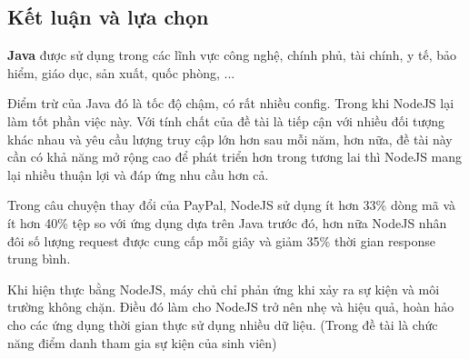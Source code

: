 \subsection{Kết luận và lựa chọn}
\textbf{Java} được sử dụng trong các lĩnh vực công nghệ, chính phủ, tài chính, y tế, bảo hiểm, giáo dục, sản xuất, quốc phòng, ...


Điểm trừ của Java đó là tốc độ chậm, có rất nhiều config. Trong khi NodeJS lại làm tốt phần việc này. Với tính chất của đề tài là tiếp cận với nhiều đối tượng khác nhau và yêu cầu lượng truy cập lớn hơn sau mỗi năm, hơn nữa, đề tài này cần có khả năng mở rộng cao để phát triển hơn trong tương lai thì NodeJS mang lại nhiều thuận lợi và đáp ứng nhu cầu hơn cả.

Trong câu chuyện thay đổi của PayPal, NodeJS sử dụng ít hơn 33\% dòng mã và ít hơn 40\% tệp so với ứng dụng dựa trên Java trước đó, hơn nữa NodeJS nhân đôi số lượng request được cung cấp mỗi giây và giảm 35\% thời gian response trung bình.


Khi hiện thực bằng NodeJS, máy chủ chỉ phản ứng khi xảy ra sự kiện và môi trường không chặn. Điều đó làm cho NodeJS trở nên nhẹ và hiệu quả, hoàn hảo cho các ứng dụng thời gian thực sử dụng nhiều dữ liệu. (Trong đề tài là chức năng điểm danh tham gia sự kiện của sinh viên)
